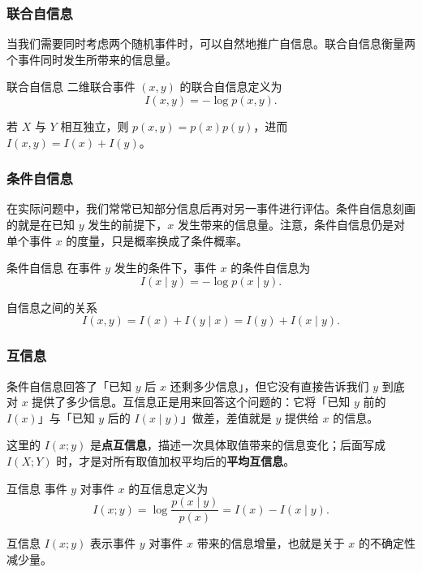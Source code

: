 \subsubsection{联合自信息}
当我们需要同时考虑两个随机事件时，可以自然地推广自信息。联合自信息衡量两个事件同时发生所带来的信息量。

\begin{definitionBox}{联合自信息}
二维联合事件 $(x,y)$ 的联合自信息定义为
\[
I(x,y) = -\log p(x,y).
\]
\end{definitionBox}

若 $X$ 与 $Y$ 相互独立，则 $p(x,y)=p(x)p(y)$，进而 $I(x,y)=I(x)+I(y)$。

\subsubsection{条件自信息}
在实际问题中，我们常常已知部分信息后再对另一事件进行评估。条件自信息刻画的就是在已知 $y$ 发生的前提下，$x$ 发生带来的信息量。注意，条件自信息仍是对单个事件 $x$ 的度量，只是概率换成了条件概率。

\begin{definitionBox}{条件自信息}
在事件 $y$ 发生的条件下，事件 $x$ 的条件自信息为
\[
I(x \mid y) = -\log p(x \mid y).
\]
\end{definitionBox}

\begin{formulaBox}{自信息之间的关系}
\[
I(x,y) = I(x) + I(y \mid x) = I(y) + I(x \mid y).
\]
\end{formulaBox}

\subsubsection{互信息}
条件自信息回答了「已知 $y$ 后 $x$ 还剩多少信息」，但它没有直接告诉我们 $y$ 到底对 $x$ 提供了多少信息。互信息正是用来回答这个问题的：它将「已知 $y$ 前的 $I(x)$」与「已知 $y$ 后的 $I(x \mid y)$」做差，差值就是 $y$ 提供给 $x$ 的信息。

这里的 $I(x;y)$ 是\textbf{点互信息}，描述一次具体取值带来的信息变化；后面写成 $I(X;Y)$ 时，才是对所有取值加权平均后的\textbf{平均互信息}。

\begin{definitionBox}{互信息}
事件 $y$ 对事件 $x$ 的互信息定义为
\[
I(x;y) = \log \frac{p(x \mid y)}{p(x)} = I(x) - I(x \mid y).
\]
\end{definitionBox}

互信息 $I(x;y)$ 表示事件 $y$ 对事件 $x$ 带来的信息增量，也就是关于 $x$ 的不确定性减少量。

